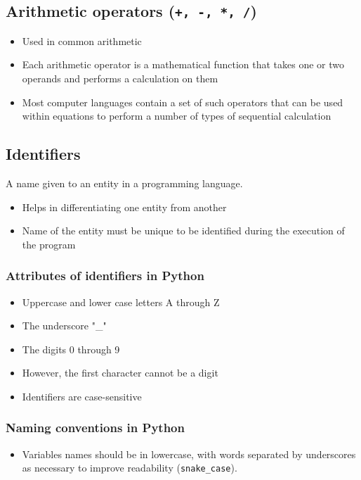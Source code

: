 \documentclass[11pt]{article}
\begin{document}
\subsection{Arithmetic operators (\texttt{+, -, *, /})}
\label{sec:org3bc4f11}
\begin{itemize}
\item Used in common arithmetic
\item Each arithmetic operator is a mathematical function that takes one or two operands and performs a calculation on them
\item Most computer languages contain a set of such operators that can be used within equations to perform a number of types of sequential calculation
\end{itemize}
\subsection{Identifiers}
\label{sec:orgc8691fa}
A name given to an entity in a programming language.
\begin{itemize}
\item Helps in differentiating one entity from another
\item Name of the entity must be unique to be identified during the execution of the program
\end{itemize}
\subsubsection{Attributes of identifiers in Python}
\label{sec:orgff7bd43}
\label{orgffff835}
\begin{itemize}
\item Uppercase and lower case letters A through Z
\item The underscore "\_"
\item The digits 0 through 9
\item However, the first character cannot be a digit
\item Identifiers are case-sensitive
\end{itemize}
\subsubsection{Naming conventions in Python}
\label{sec:orgc19339c}
\begin{itemize}
\item Variables names should be in lowercase, with words separated by underscores as necessary to improve readability (\texttt{snake\_case}).
\end{itemize}
\end{document}
